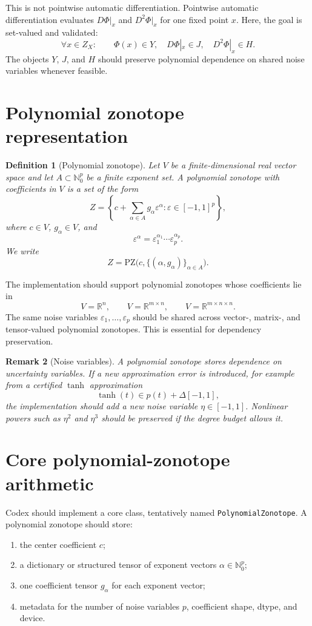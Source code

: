 \documentclass[11pt]{article}
\newtheorem{definition}{Definition}[section]
\newtheorem{remark}[definition]{Remark}
\newcommand{\R}{\mathbb{R}}
\newcommand{\N}{\mathbb{N}}
\newcommand{\PZ}{\mathrm{PZ}}
\newcommand{\eps}{\varepsilon}
\begin{document}
This is not pointwise automatic differentiation. Pointwise automatic differentiation evaluates \(D\Phi|_x\) and \(D^2\Phi|_x\) for one fixed point \(x\). Here, the goal is set-valued and validated:
\[
    \forall x\in Z_X:
    \qquad
    \Phi(x)\in Y,
    \quad
    D\Phi|_x\in J,
    \quad
    D^2\Phi|_x\in H.
\]
The objects \(Y\), \(J\), and \(H\) should preserve polynomial dependence on shared noise variables whenever feasible.

\section{Polynomial zonotope representation}

\begin{definition}[Polynomial zonotope]
Let \(V\) be a finite-dimensional real vector space and let \(A\subset\N_0^p\) be a finite exponent set. A polynomial zonotope with coefficients in \(V\) is a set of the form
\[
    Z
    =
    \left\{
        c+\sum_{\alpha\in A}g_\alpha\eps^\alpha
        :
        \eps\in[-1,1]^p
    \right\},
\]
where \(c\in V\), \(g_\alpha\in V\), and
\[
    \eps^\alpha
    =
    \eps_1^{\alpha_1}\cdots\eps_p^{\alpha_p}.
\]
We write
\[
    Z=\PZ\bigl(c,\{(\alpha,g_\alpha)\}_{\alpha\in A}\bigr).
\]
\end{definition}

The implementation should support polynomial zonotopes whose coefficients lie in
\[
    V=\R^n,
    \qquad
    V=\R^{m\times n},
    \qquad
    V=\R^{m\times n\times n}.
\]
The same noise variables \(\eps_1,\ldots,\eps_p\) should be shared across vector-, matrix-, and tensor-valued polynomial zonotopes. This is essential for dependency preservation.

\begin{remark}[Noise variables]
A polynomial zonotope stores dependence on uncertainty variables. If a new approximation error is introduced, for example from a certified \(\tanh\) approximation
\[
    \tanh(t)\in p(t)+\Delta[-1,1],
\]
the implementation should add a new noise variable \(\eta\in[-1,1]\). Nonlinear powers such as \(\eta^2\) and \(\eta^3\) should be preserved if the degree budget allows it.
\end{remark}

\section{Core polynomial-zonotope arithmetic}

Codex should implement a core class, tentatively named \texttt{PolynomialZonotope}. A polynomial zonotope should store:
\begin{enumerate}[label=(\roman*)]
    \item the center coefficient \(c\);
    \item a dictionary or structured tensor of exponent vectors \(\alpha\in\N_0^p\);
    \item one coefficient tensor \(g_\alpha\) for each exponent vector;
    \item metadata for the number of noise variables \(p\), coefficient shape, dtype, and device.
\end{enumerate}
\end{document}
